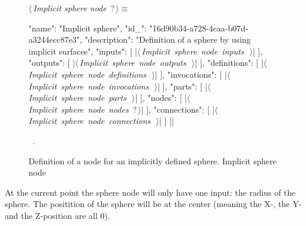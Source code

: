 \documentclass[%
    a4paper,    %
    justified,  %
    nobib,      %
    openany     %
]{tufte-book}
\begin{document}
\begin{figure}
\begin{flushleft} \small
\begin{minipage}{\linewidth}\label{scrap99}\raggedright\small
{} $\langle\,${\itshape Implicit sphere node}\nobreak\ {\footnotesize {?}}$\,\rangle\equiv$
\vspace{-1ex}
\begin{pythoncode}
{
    "name": "Implicit sphere",
    "id_": "16d90b34-a728-4caa-b07d-a3244ecc87e3",
    "description": "Definition of a sphere by using implicit surfaces",
    "inputs": [
        |\hbox{$\langle\,${\itshape Implicit sphere node inputs}\nobreak\ {\footnotesize {}}$\,\rangle$}|
    ],
    "outputs": [
        |\hbox{$\langle\,${\itshape Implicit sphere node outputs}\nobreak\ {\footnotesize {}}$\,\rangle$}|
    ],
    "definitions": [
        |\hbox{$\langle\,${\itshape Implicit sphere node definitions}\nobreak\ {\footnotesize {}}$\,\rangle$}|
    ],
    "invocations": [
        |\hbox{$\langle\,${\itshape Implicit sphere node invocations}\nobreak\ {\footnotesize {}}$\,\rangle$}|
    ],
    "parts": [
        |\hbox{$\langle\,${\itshape Implicit sphere node parts}\nobreak\ {\footnotesize {}}$\,\rangle$}|
    ],
    "nodes": [
        |\hbox{$\langle\,${\itshape Implicit sphere node nodes}\nobreak\ {\footnotesize ?}$\,\rangle$}|
    ],
    "connections": [
        |\hbox{$\langle\,${\itshape Implicit sphere node connections}\nobreak\ {\footnotesize {}}$\,\rangle$}|
    ]
}|\NWsep|
\end{pythoncode}
\vspace{1.5ex}
\footnotesize
\begin{list}{}{\setlength{\itemsep}{-\parsep}\setlength{\itemindent}{-\leftmargin}}
\item \NWtxtMacroRefIn\ .

\item{}
\end{list}
\end{minipage}\vspace{4ex}
\end{flushleft}
\caption{Definition of a node for an implicitly defined sphere.
  \newline{}\newline{}Implicit sphere node}
\label{editor:lst:nodes:sphere-node}
\end{figure}

At the current point the sphere node will only have one input: the radius of
the sphere. The positition of the sphere will be at the center (meaning the
X-, the Y- and the Z-position are all 0).
\end{document}
